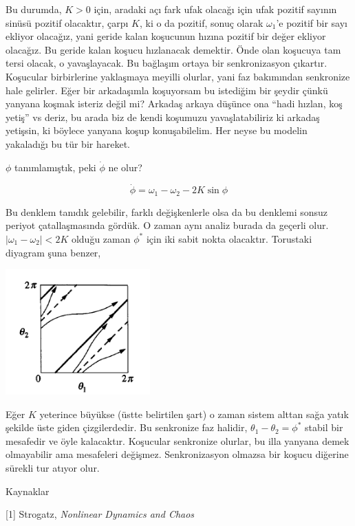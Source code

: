 \documentclass[12pt,fleqn]{article}\usepackage{../../common}
\begin{document}
Bu durumda, $K > 0$ için, aradaki açı fark ufak olacağı için ufak pozitif
sayının sinüsü pozitif olacaktır, çarpı $K$, ki o da pozitif, sonuç olarak
$\omega_1$'e pozitif bir sayı ekliyor olacağız, yani geride kalan koşucunun
hızına pozitif bir değer ekliyor olacağız. Bu geride kalan koşucu
hızlanacak demektir. Önde olan koşucuya tam tersi olacak, o
yavaşlayacak. Bu bağlaşım ortaya bir senkronizasyon çıkartır. Koşucular
birbirlerine yaklaşmaya meyilli olurlar, yani faz bakımından senkronize
hale gelirler. Eğer bir arkadaşımla koşuyorsam bu istediğim bir şeydir
çünkü yanyana koşmak isteriz değil mi? Arkadaş arkaya düşünce ona ``hadi
hızlan, koş yetiş'' vs deriz, bu arada biz de kendi koşumuzu
yavaşlatabiliriz ki arkadaş yetişsin, ki böylece yanyana koşup
konuşabilelim. Her neyse bu modelin yakaladığı bu tür bir hareket. 

$\phi$ tanımlamıştık, peki $\dot{\phi}$ ne olur? 

$$ 
\dot{\phi} = \omega_1 - \omega_2 - 2K \sin\phi
$$

Bu denklem tanıdık gelebilir, farklı değişkenlerle olsa da bu denklemi
sonsuz periyot çatallaşmasında gördük. O zaman aynı analiz burada da
geçerli olur. $|\omega_1-\omega_2| < 2K$ olduğu zaman $\phi^\ast$ için iki
sabit nokta olacaktır. Torustaki diyagram şuna benzer, 

\includegraphics[width=15em]{14_27.png}

Eğer $K$ yeterince büyükse (üstte belirtilen şart) o zaman sistem alttan
sağa yatık şekilde üste giden çizgilerdedir. Bu senkronize faz halidir,
$\theta_1-\theta_2 = \phi^\ast$ stabil bir mesafedir ve öyle
kalacaktır. Koşucular senkronize olurlar, bu illa yanyana demek olmayabilir
ama mesafeleri değişmez. Senkronizasyon olmazsa bir koşucu diğerine sürekli
tur atıyor olur.

Kaynaklar

[1] Strogatz, {\em Nonlinear Dynamics and Chaos}
\end{document}
